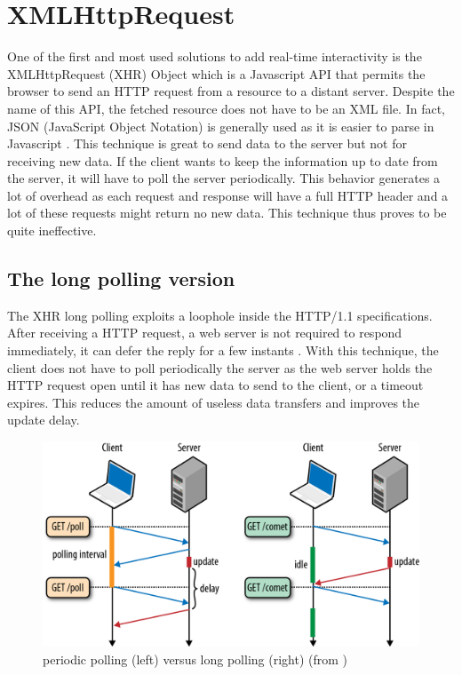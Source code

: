 \documentclass[10pt,journal,compsoc]{IEEEtran}
\begin{document}
\section{XMLHttpRequest}
\label{XHR}
One of the first and most used solutions to add real-time interactivity is the XMLHttpRequest (XHR) Object which is a Javascript API that permits the browser to send an HTTP request from a resource to a distant server.
Despite the name of this API, the fetched resource does not have to be an XML file.
In fact, JSON (JavaScript Object Notation) is generally used as it is easier to parse in Javascript \cite{collinalatency}.
This technique is great to send data to the server but not for receiving new data.
If the client wants to keep the information up to date from the server, it will have to poll the server periodically.
This behavior generates a lot of overhead as each request and response will have a full HTTP header and a lot of these requests might return no new data. This technique thus proves to be quite ineffective.

\subsection{The long polling version}

The XHR long polling exploits a loophole inside the \mbox{HTTP/1.1} specifications.
After receiving a HTTP request, a web server is not required to respond immediately, it can defer the reply for a few instants \cite{collinalatency}.
With this technique, the client does not have to poll periodically the server as the web server holds the HTTP request open until it has new data to send to the client, or a timeout expires.
This reduces the amount of useless data transfers and improves the update delay.

\begin{figure}[!ht]
  \centering
  \includegraphics[width=\linewidth]{poll_vs_lpoll}
  \caption{periodic polling (left) versus long polling (right) (from \cite{HighPerfBrowserNetworking:polling})}
  \label{poll_vs_lpoll}
\end{figure}
\end{document}

